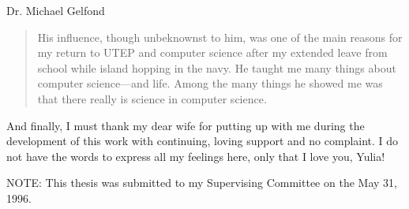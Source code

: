 \noindent
Dr. Michael Gelfond
\begin{quote}
  His influence, though unbeknownst to him, was one of the main reasons for 
  my return to UTEP and computer science after my extended leave from school
  while island hopping in the navy.  He taught me many things about computer
  science---and life.  Among the many things he showed me was that there 
  really is science in computer science.
\end{quote}

And finally, I must thank my dear wife for putting up with me during the 
development of this work with continuing, loving support and no complaint. 
I do not have the words to express all my feelings here, only that I love you, 
Yulia!

\vfill
\noindent
NOTE: This thesis was submitted to my Supervising Committee on the May 31, 1996.
